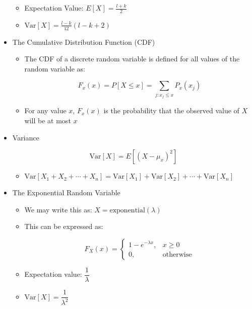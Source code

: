 \begin{itemize}
\begin{itemize}
        \item Expectation Value: $E[X]=\frac{l+k}{2}$

        \item $\text{Var}[X]=\frac{l-k}{12}(l-k+2)$

    \end{itemize}

  \item The Cumulative Distribution Function (CDF)

    \begin{itemize}

      \item The CDF of a discrete random variable is defined for all values of the random variable as:

        $$F_x(x)=P[X\leq x]=\sum_{j:x_j\leq x}P_x(x_j)$$

      \item For any value $x$, $F_x(x)$ is the probability that the observed value of $X$ will be at most $x$

    \end{itemize}

  \item Variance

    $$\text{Var}[X]=E[(X-\mu_x)^2]$$

    \begin{itemize}

      \item $\text{Var}[X_1+X_2+\cdots+X_n]=\text{Var}[X_1]+\text{Var}[X_2]+\cdots+\text{Var}[X_n]$

    \end{itemize}

  \item The Exponential Random Variable

    \begin{itemize}

      \item We may write this as: $X=\text{exponential}(\lambda)$

      \item This can be expressed as:

        $$F_X(x)=\left\{ \begin{array}{ll} 1-e^{-\lambda x}, & x\geq0\\ 0,&\text{otherwise}\end{array}$$

      \item Expectation value: $\dfrac{1}{\lambda}$

      \item $\text{Var}[X]=\dfrac{1}{\lambda^2}$

    \end{itemize}

\end{itemize}



